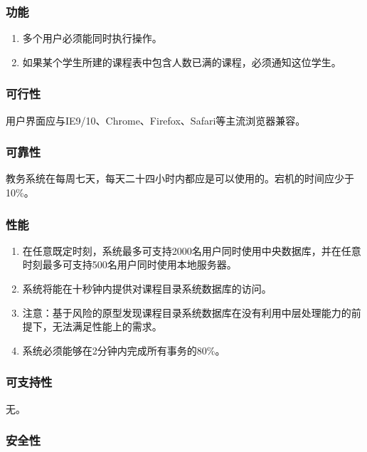 \subsubsection{功能}
  
  \begin{enumerate}
    \item 多个用户必须能同时执行操作。
    \item 如果某个学生所建的课程表中包含人数已满的课程，必须通知这位学生。
  \end{enumerate}
  
\subsubsection{可行性}
  
用户界面应与IE9/10、Chrome、Firefox、Safari等主流浏览器兼容。
  
\subsubsection{可靠性}
  
教务系统在每周七天，每天二十四小时内都应是可以使用的。宕机的时间应少于10\%。
  
\subsubsection{性能}
  
  \begin{enumerate}
    \item 在任意既定时刻，系统最多可支持2000名用户同时使用中央数据库，并在任意时刻最多可支持500名用户同时使用本地服务器。
    \item 系统将能在十秒钟内提供对课程目录系统数据库的访问。
    \item 注意：基于风险的原型发现课程目录系统数据库在没有利用中层处理能力的前提下，无法满足性能上的需求。
    \item 系统必须能够在2分钟内完成所有事务的80\%。
  \end{enumerate}
  
\subsubsection{可支持性}
  
无。
  
\subsubsection{安全性}
  
